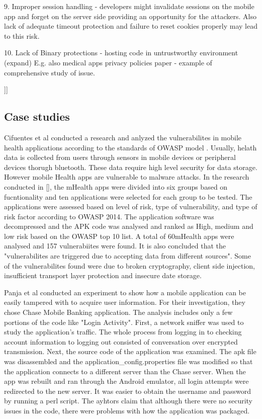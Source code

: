 \documentclass{mproj}
\begin{document}
9. Improper session handling - developers might invalidate sessions on the mobile app and forget on the server side providing an opportunity for the attackers. Also lack of adequate timeout protection and failure to reset cookies properly may lead to this risk.

10. Lack of Binary protections - hosting code in untrustworthy environment (expand)
E.g. also medical apps privacy policies paper - example of comprehensive study of issue.

]]

\subsection{Case studies}
Cifuentes et al\cite{cifuentes2015} conducted a research and anlyzed the vulnerabilites in mobile health applications according to the standards of OWASP model \cite{owasp}.  Usually, helath data is collected from users through sensors in mobile devices or peripheral devices thorugh bluetooth. These data require high level security for data storage. However mobile Health apps are vulnerable to malware attacks. In the research conducted in [], the mHealth apps were divided into six groups based on fucntionality and ten applications were selected for each group to be tested. The applications were assessed based on level of risk, type of
vulnerability, and type of risk factor according to OWASP 2014. The application software was decompressed and the APK code was analysed and ranked as High, medium and low risk based on the OWASP top 10 list. A total of 60mHealth apps were analysed and 157 vulnerabiites were found. It is also concluded that the "vulnerabilites are triggered due to accepting data from different sources". Some of the vulnerabilites found were due to broken cryptography, client side injection, insufficient transport layer protection and insecure date storage.

Panja et al\cite{panja2013} conducted an experiment to show how a mobile application can be easily tampered with to acquire user information. For their investigation, they chose Chase Mobile Banking application. The analysis includes only a few portions of the code like "Login Activity". First, a network sniffer was used to study the application's traffic. The whole process from logging in to checking account information  to logging out consisted of conversation over encrypted transmission. Next, the source code of the application was examined. The apk file was disassembled and the application\_config.properties file was modified so that the application connects to a different server than the Chase server. When the app was rebuilt and ran through the Android emulator, all login attempts were redirected to the new server. It was easier to obtain the username and password by running a perl script. The ayhtors claim that although there were no security issues in the code, there were problems with how the application was packaged.
\end{document}
